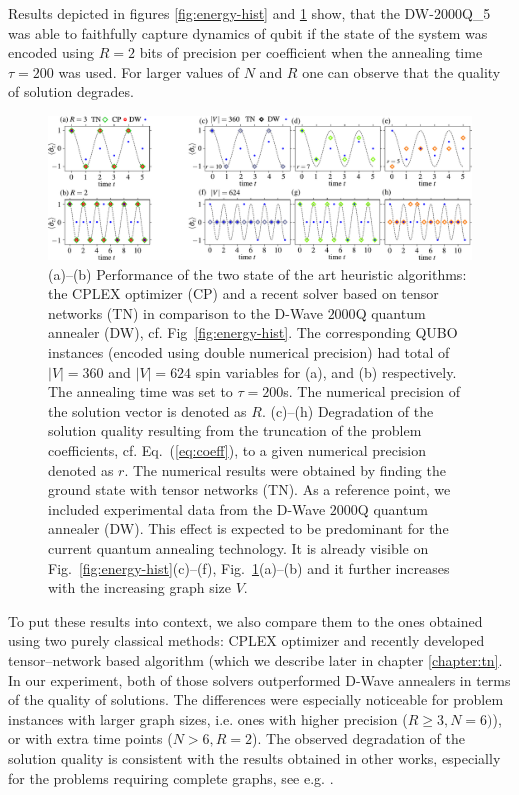 Results depicted in figures \ref{fig:energy-hist} and \ref{fig:cplex_tn_dwave} show, that the DW-2000Q\_{5} was able to faithfully capture dynamics of qubit if the state of the system was encoded using $R=2$ bits of precision per coefficient when the annealing time $\tau=200$ was used. For larger values of $N$ and $R$ one can observe that the quality of solution degrades.

\begin{figure}
	\centering
	\includegraphics[width=\textwidth]{figures/fig34_merge.pdf}
	\caption{ (a)--(b) Performance of the two state of the art heuristic
	  algorithms: the CPLEX optimizer (CP) and a recent solver based on tensor
	  networks (TN) in comparison to the D-Wave $2000$Q quantum annealer (DW),
	  cf. Fig~\ref{fig:energy-hist}. The corresponding QUBO instances (encoded
	  using double numerical precision) had total of $|V|=360$ and $|V|=624$
	  spin variables for (a), and (b) respectively. The annealing time was set
	  to $\tau=200$\textmu{}s. The numerical precision of the solution vector is
	  denoted as $R$.%
	  (c)--(h) Degradation of the solution quality resulting from the truncation
	  of the problem coefficients, cf. Eq.~(\ref{eq:coeff}), to a given
	  numerical precision denoted as $r$. The numerical results were obtained by
	  finding the ground state with tensor networks (TN). As a reference point,
	  we included experimental data from the D-Wave $2000$Q quantum annealer
	  (DW). This effect is expected to be predominant for the current quantum
	  annealing technology. It is already visible on
	  Fig.~\ref{fig:energy-hist}(c)--(f), Fig.~\ref{fig:cplex_tn_dwave}(a)--(b)
	  and it further increases with the increasing graph size $V$. }
	\label{fig:cplex_tn_dwave}
\end{figure}

To put these results into context, we also compare them to the ones obtained
using two purely classical methods: CPLEX optimizer and recently developed
tensor--network based algorithm (which we describe later in chapter
\ref{chapter:tn}. In our experiment, both of those solvers outperformed D-Wave
annealers in terms of the quality of solutions. The differences were especially
noticeable for problem instances with larger graph sizes, i.e. ones with higher
precision ($R \ge 3, N=6)$), or with extra time points ($N > 6, R = 2$). The
observed degradation of the solution quality is consistent with the results
obtained in other works, especially for the problems requiring complete graphs,
see e.g. \cite{Hamerly2019}.

